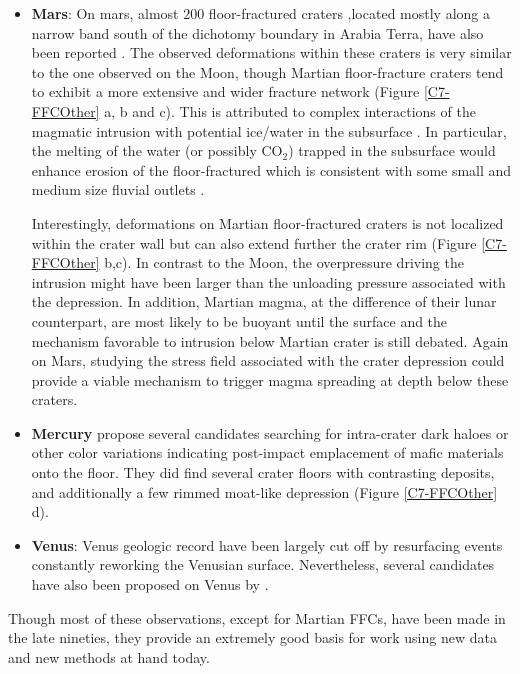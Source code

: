 \begin{itemize}
\item  \textbf{Mars}: On  mars, almost  $200$ floor-fractured  craters
  ,located mostly along a narrow  band south of the dichotomy boundary
  in Arabia Terra, have also been reported \citep{Bamberg:2014hb}. The
  observed deformations  within these craters  is very similar  to the
  one observed on the Moon, though Martian floor-fracture craters tend
  to  exhibit a  more  extensive and  wider  fracture network  (Figure
  \ref{C7-FFCOther}  a,  b  and  c). This  is  attributed  to  complex
  interactions of  the magmatic intrusion with  potential ice/water in
  the  subsurface  \citep{Sato:2010ex,Bamberg:2014hb}. In  particular,
  the  melting  of the  water  (or  possibly  CO$_2$) trapped  in  the
  subsurface  would enhance  erosion of  the floor-fractured  which is
  consistent  with   some  small  and  medium   size  fluvial  outlets
  \citep{Sato:2010ex}.

  Interestingly,  deformations on  Martian floor-fractured  craters is
  not localized within the crater wall but can also extend further the
  crater rim (Figure \ref{C7-FFCOther} b,c).  In contrast to the Moon,
  the overpressure driving  the intrusion might have  been larger than
  the unloading pressure associated  with the depression. In addition,
  Martian magma,  at the  difference of  their lunar  counterpart, are
  most  likely to  be  buoyant  until the  surface  and the  mechanism
  favorable to intrusion below Martian  crater is still debated. Again
  on  Mars,  studying the  stress  field  associated with  the  crater
  depression  could  provide  a  viable  mechanism  to  trigger  magma
  spreading at depth below these craters.

\item   \textbf{Mercury}    \citet{Schultz:1977ec}   propose   several
  candidates  searching for  intra-crater dark  haloes or  other color
  variations  indicating post-impact  emplacement  of mafic  materials
  onto the floor. They did find several crater floors with contrasting
  deposits, and additionally a few rimmed moat-like depression (Figure
  \ref{C7-FFCOther} d).

\item \textbf{Venus}: Venus geologic record  have been largely cut off
  by  resurfacing events  constantly reworking  the Venusian  surface.
  Nevertheless, several candidates have also been proposed on Venus by
  \citet{Wichman:1995ju}.
\end{itemize}

Though most of these observations,  except for Martian FFCs, have been
made in  the late nineties, they  provide an extremely good  basis for
work using new data and new methods at hand today.

